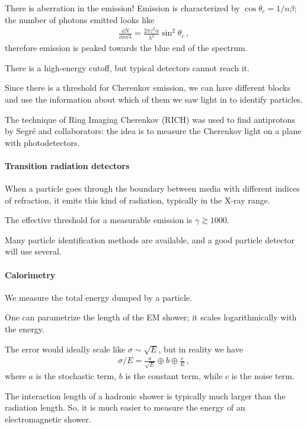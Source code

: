 \documentclass[main.tex]{subfiles}
\begin{document}
There is aberration in the emission! 
Emission is characterized by \(\cos \theta _c = 1 / n \beta \); 
the number of photons emitted looks like 
%
\begin{align}
\frac{ \dd{N}}{ \dd{x} \dd{\lambda }} = \frac{2 \pi z^2\alpha }{\lambda^2} \sin^2 \theta _c
\,,
\end{align}
%
therefore emission is peaked towards the blue end of the spectrum. 

There is a high-energy cutoff, but typical detectors cannot reach it. 

Since there is a threshold for Cherenkov emission, we can have different 
blocks and use the information about which of them we saw light in 
to identify particles. 

The technique of Ring Imaging Cherenkov (RICH) was used to 
find antiprotons by Segré and collaborators: 
the idea is to measure the Cherenkov light on a plane with photodetectors. 

\paragraph{Transition radiation detectors}

When a particle goes through the boundary between media with different 
indices of refraction, it emits this kind of radiation, typically in the X-ray range. 

The effective threshold for a measurable emission is \( \gamma \gtrsim 1000\). 

Many particle identification methods are available, and a good 
particle detector will use several. 

\paragraph{Calorimetry}

We measure the total energy dumped by a particle. 

One can parametrize the length of the EM shower; it scales logarithmically with the energy.

The error would ideally scale like \(\sigma \sim \sqrt{E}\), but in reality we have 
%
\begin{align}
\sigma / E = \frac{a}{\sqrt{E}} \oplus b \oplus \frac{c}{E}
\,,
\end{align}
%
where \(a\) is the stochastic term, \(b\) is the constant term, while \(c\) is the noise term. 

The interaction length of a hadronic shower is typically much larger than the radiation length. 
So, it is much easier to measure the energy of an electromagnetic shower. 
\end{document}
